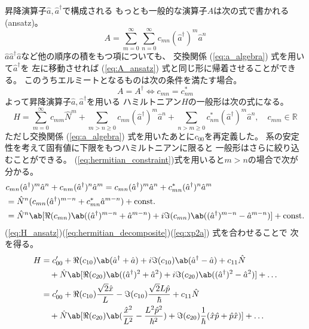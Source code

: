 昇降演算子$\hat{a},\hat{a}^\dagger$で構成される
もっとも一般的な演算子$A$は次の式で書かれる (ansatz)。
\begin{equation}
  \label{eq:A_ansatz}
  A=\sum_{m=0}^\infty\sum_{n=0}^\infty c_{mn}(\hat{a}^\dagger)^m\hat{a}^n
\end{equation}
$\hat{a}\hat{a}^\dagger\hat{a}$など他の順序の積をもつ項についても、
交換関係 (\ref{eq:a_algebra}) 式を用いて$\hat{a}^\dagger$を
左に移動させれば (\ref{eq:A_ansatz}) 式と同じ形に帰着させることができる。
このうちエルミートとなるものは次の条件を満たす場合。
\begin{equation}
  \label{eq:hermitian_constraint}
  A=A^\dagger
  \Leftrightarrow
  c_{mn} = c^\ast_{nm}
\end{equation}
よって昇降演算子$\hat{a},\hat{a}^\dagger$を用いる
ハミルトニアン$H$の一般形は次の式になる。
\begin{equation}
  \label{eq:H_ansatz}
  H=
  \sum_{m=0}^\infty c_{mm}\hat{N}^m
  +\sum_{m>n\geq0} c_{mn}(\hat{a}^\dagger)^m\hat{a}^n
  +\sum_{n>m\geq0} c^\ast_{nm}(\hat{a}^\dagger)^m\hat{a}^n,\quad
  c_{mm}\in\mathbb{R}
\end{equation}
ただし交換関係 (\ref{eq:a_algebra}) 式を用いたあとに$c_{00}$を再定義した。
系の安定性を考えて固有値に下限をもつハミルトニアンに限ると
一般形はさらに絞り込むことができる。
(\ref{eq:hermitian_constraint})式を用いると$m>n$の場合で次が分かる。
\begin{equation}
  \label{eq:hermitian_decomposite}
  \begin{split}
    &c_{mn}(\hat{a}^\dagger)^m\hat{a}^n
    + c_{nm}(\hat{a}^\dagger)^n\hat{a}^m
    =c_{mn}(\hat{a}^\dagger)^m\hat{a}^n
    + c^\ast_{mn}(\hat{a}^\dagger)^n\hat{a}^m \\
    &=\hat{N}^n
    (c_{mn}(\hat{a}^\dagger)^{m-n}+c^\ast_{mn}\hat{a}^{m-n})
    +\text{const.} \\
    &=\hat{N}^n
    \ab[
      \Re(c_{mn})\ab((\hat{a}^\dagger)^{m-n}+\hat{a}^{m-n})
      +i\Im(c_{mn})\ab((\hat{a}^\dagger)^{m-n}-\hat{a}^{m-n})
    ]+\text{const.}
  \end{split}
\end{equation}
(\ref{eq:H_ansatz})(\ref{eq:hermitian_decomposite})(\ref{eq:xp2a})
式を合わせることで
次を得る。
\begin{equation}
  \begin{split}
    H &= c'_{00} +
    \Re(c_{10})\ab(\hat{a}^\dagger+\hat{a})
    +i\Im(c_{10})\ab(\hat{a}^\dagger-\hat{a})
    +c_{11}\hat{N} \\
    &\quad+\hat{N}
    \ab[
      \Re(c_{20})\ab((\hat{a}^\dagger)^2+\hat{a}^2)
      +i\Im(c_{20})\ab((\hat{a}^\dagger)^2-\hat{a}^2)
    ]
    +\ldots \\
    &= c'_{00} +
    \Re(c_{10})\frac{\sqrt{2}\hat{x}}{L}
    -\Im(c_{10})\frac{\sqrt{2}L\hat{p}}{\hbar}
    +c_{11}\hat{N} \\
    &\quad+\hat{N}
    \ab[\Re(c_{20})
      \ab(
      \frac{\hat{x}^2}{L^2}-\frac{L^2\hat{p}^2}{\hbar^2}
      )
      +\Im(c_{20})
      \frac{1}{\hbar}(\hat{x}\hat{p}+\hat{p}\hat{x})
    ]
    +\ldots
  \end{split}
\end{equation}
